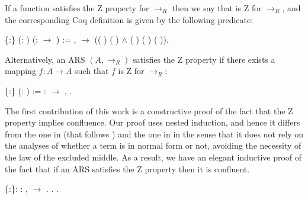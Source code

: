 If a function  satisfies the Z property for $\to_R$ then
we say that  is Z for $\to_R$, and the corresponding Coq
definition is given by the following predicate: 
\begin{coqdoccode}
\coqdocemptyline
\coqdocnoindent
{}  \{:\} (:  ) (:  \ensuremath{\rightarrow} ) := \coqdockw{\ensuremath{\forall}}  ,    \ensuremath{\rightarrow} (( )   ( ) \ensuremath{\land} ( ) ( ) ( )).\coqdoceol
\coqdocemptyline
\end{coqdoccode}
Alternatively, an ARS $(A,\to_R)$ satisfies the Z property if there
exists a mapping $f:A \to A$ such that $f$ is Z for $\to_R$: 
\begin{coqdoccode}
\coqdocemptyline
\coqdocnoindent
{}  \{:\} (:  ) := \coqdoctac{\ensuremath{\exists}} : \ensuremath{\rightarrow} ,   .\coqdoceol
\coqdocemptyline
\end{coqdoccode}
The first contribution of this work is a constructive proof of the fact that the Z property implies confluence. Our proof uses nested induction, and hence it differs from the one in \cite{kesnerTheoryExplicitSubstitutions2009} (that follows \cite{dehornoy2008z}) and the one in \cite{felgenhauerProperty2016} in the sense that it does not rely on the analyses of whether a term is in normal form or not, avoiding the necessity of the law of the excluded middle. As a result, we have an elegant inductive proof of the fact that if an ARS satisfies the Z property then it is confluent. 
\begin{coqdoccode}
\coqdocemptyline
\coqdocnoindent
{}  \{:\}: \coqdockw{\ensuremath{\forall}} :  ,   \ensuremath{\rightarrow}  .\coqdoceol
\coqdocnoindent
{}.\coqdoceol
\coqdocindent{1.00em}
  . \end{coqdoccode}
